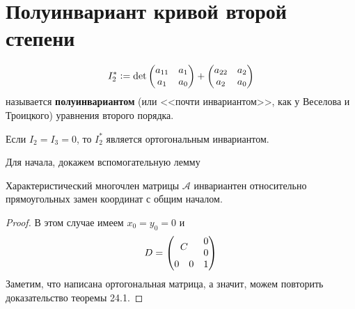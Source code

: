 \section{Полуинвариант кривой второй степени}

\begin{definition}
    $$\displaystyle I_2^\ast \vcentcolon = \det
    \begin{pmatrix}
        a_{11} & a_1\\
        a_1 & a_0
    \end{pmatrix} + 
    \begin{pmatrix}
        a_{22} & a_2\\
        a_2 & a_0
    \end{pmatrix}
    $$
    называется \textbf{полуинвариантом} (или <<почти инвариантом>>, как у Веселова и Троицкого) уравнения второго порядка.
\end{definition}

\begin{theorem}
    Если $I_2 = I_3 = 0$, то $I_2^\ast$ является ортогональным инвариантом\footnotemark.
\end{theorem}


Для начала, докажем вспомогательную лемму

\begin{lemma}
    Характеристический многочлен матрицы $\mathcal{A}$ инвариантен относительно прямоугольных замен координат с общим началом.
\end{lemma}

\begin{proof}
    В этом случае имеем $x_0 = y_0 = 0$ и 
    $$
    D = 
    \begin{pmatrix}
        \multicolumn{2}{c}{\multirow{2}{*}{$C$}} & 0\\
        \multicolumn{2}{c}{} & 0\\
        0 & 0 & 1
    \end{pmatrix}
    $$
    Заметим, что написана ортогональная матрица, а значит, можем повторить доказательство теоремы 24.1.
\end{proof}

